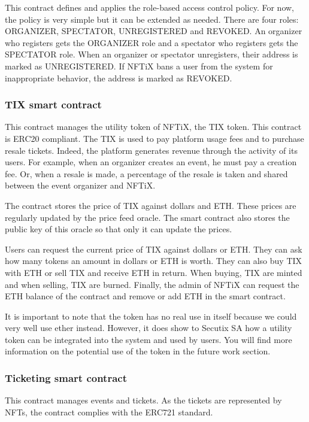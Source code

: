 \documentclass[a4paper,11pt,oneside]{report}
\begin{document}
This contract defines and applies the role-based access control policy. For now, the policy is very simple but it can be extended as needed. There are four roles: ORGANIZER, SPECTATOR, UNREGISTERED and REVOKED. An organizer who registers gets the ORGANIZER role and a spectator who registers gets the SPECTATOR role. When an organizer or spectator unregisters, their address is marked as UNREGISTERED. If NFTiX bans a user from the system for inappropriate behavior, the address is marked as REVOKED.

\subsubsection{TIX smart contract}
This contract manages the utility token of NFTiX, the TIX token. This contract is ERC20 compliant. The TIX is used to pay platform usage fees and to purchase resale tickets. Indeed, the platform generates revenue through the activity of its users. For example, when an organizer creates an event, he must pay a creation fee. Or, when a resale is made, a percentage of the resale is taken and shared between the event organizer and NFTiX.

The contract stores the price of TIX against dollars and ETH. These prices are regularly updated by the price feed oracle. The smart contract also stores the public key of this oracle so that only it can update the prices.

Users can request the current price of TIX against dollars or ETH. They can ask how many tokens an amount in dollars or ETH is worth. They can also buy TIX with ETH or sell TIX and receive ETH in return. When buying, TIX are minted and when selling, TIX are burned. Finally, the admin of NFTiX can request the ETH balance of the contract and remove or add ETH in the smart contract.

It is important to note that the token has no real use in itself because we could very well use ether instead. However, it does show to Secutix SA how a utility token can be integrated into the system and used by users. You will find more information on the potential use of the token in the future work section.

\subsubsection{Ticketing smart contract}
This contract manages events and tickets. As the tickets are represented by NFTs, the contract complies with the ERC721 standard.
\end{document}
